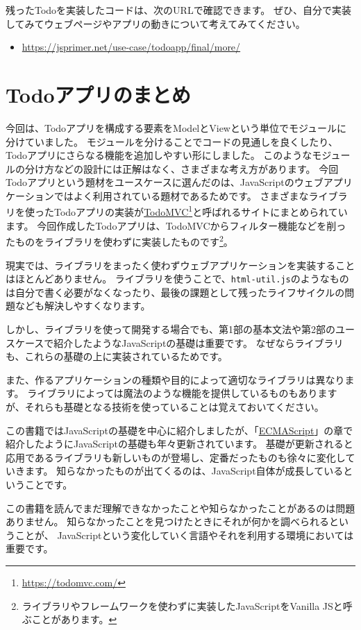 残ったTodoを実装したコードは、次のURLで確認できます。
ぜひ、自分で実装してみてウェブページやアプリの動きについて考えてみてください。

\begin{itemize}
\item
  \url{https://jsprimer.net/use-case/todoapp/final/more/}
\end{itemize}

\hypertarget{todo-conclusion}{%
\section{Todoアプリのまとめ}\label{todo-conclusion}}

今回は、Todoアプリを構成する要素をModelとViewという単位でモジュールに分けていました。
モジュールを分けることでコードの見通しを良くしたり、Todoアプリにさらなる機能を追加しやすい形にしました。
このようなモジュールの分け方などの設計には正解はなく、さまざまな考え方があります。
\newpage
今回Todoアプリという題材をユースケースに選んだのは、JavaScriptのウェブアプリケーションではよく利用されている題材であるためです。
さまざまなライブラリを使ったTodoアプリの実装が\href{https://todomvc.com/}{TodoMVC}\footnote{\url{https://todomvc.com/}}と呼ばれるサイトにまとめられています。
今回作成したTodoアプリは、TodoMVCからフィルター機能などを削ったものをライブラリを使わずに実装したものです\footnote{ライブラリやフレームワークを使わずに実装したJavaScriptをVanilla JSと呼ぶことがあります。}。

現実では、ライブラリをまったく使わずウェブアプリケーションを実装することはほとんどありません。
ライブラリを使うことで、\texttt{html-util.js}のようなものは自分で書く必要がなくなったり、最後の課題として残ったライフサイクルの問題なども解決しやすくなります。

しかし、ライブラリを使って開発する場合でも、第1部の基本文法や第2部のユースケースで紹介したようなJavaScriptの基礎は重要です。
なぜならライブラリも、これらの基礎の上に実装されているためです。

また、作るアプリケーションの種類や目的によって適切なライブラリは異なります。
ライブラリによっては魔法のような機能を提供しているものもありますが、それらも基礎となる技術を使っていることは覚えておいてください。

この書籍ではJavaScriptの基礎を中心に紹介しましたが、「\hyperlink{ecmascript}{ECMAScript}」の章で紹介したようにJavaScriptの基礎も年々更新されています。
基礎が更新されると応用であるライブラリも新しいものが登場し、定番だったものも徐々に変化していきます。
知らなかったものが出てくるのは、JavaScript自体が成長しているということです。

この書籍を読んでまだ理解できなかったことや知らなかったことがあるのは問題ありません。
知らなかったことを見つけたときにそれが何かを調べられるということが、
JavaScriptという変化していく言語やそれを利用する環境においては重要です。
